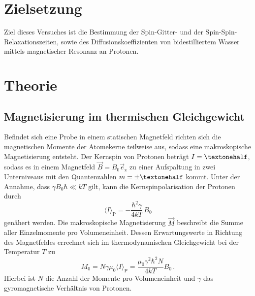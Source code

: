 \section{Zielsetzung}
Ziel dieses Versuches ist die Bestimmung der Spin-Gitter- und der Spin-Spin-Relaxationszeiten, sowie des Diffusionskoeffizienten von bidestilliertem Wasser mittels magnetischer Resonanz an Protonen.

\section{Theorie}
\subsection{Magnetisierung im thermischen Gleichgewicht}
Befindet sich eine Probe in einem statischen Magnetfeld richten sich die magnetischen Momente der Atomekerne teilweise aus, sodass eine makroskopische Magnetisierung entsteht.
Der Kernspin von Protonen beträgt $I=\textonehalf$, sodass es in einem Magnetfeld $\vec{B}=B_0\vec{e}_\text{z}$ zu einer Aufspaltung in zwei Unterniveaus mit den Quantenzahlen $m=\pm \textonehalf$ kommt.
Unter der Annahme, dass $\gamma B_0 \hbar \ll kT$ gilt, kann die Kernspinpolarisation der Protonen durch
\begin{equation*}
    \langle I \rangle_\text{P} = -\frac{\hbar^2\gamma}{4kT}\,B_0
\end{equation*}
genähert werden.
Die makroskopische Magnetisierung $\vec{M}$ beschreibt die Summe aller Einzelmomente pro Volumeneinheit.
Dessen Erwartungswerte in Richtung des Magnetfeldes errechnet sich im thermodynamischen Gleichgewicht bei der Temperatur $T$ zu 
\begin{equation*}
    M_0=N\gamma \mu_0 \langle I \rangle_\text{P} = \frac{\mu_0\gamma^2\hbar^2N}{4kT}B_0\, .
\end{equation*}
Hierbei ist $N$ die Anzahl der Momente pro Volumeneinheit und $\gamma$ das  gyromagnetische Verhältnis von Protonen.

